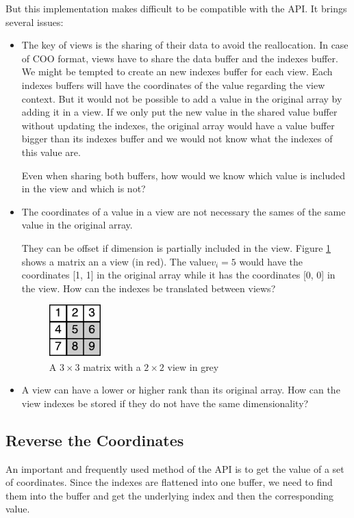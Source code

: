 But this implementation makes difficult to be compatible with the API. It brings several issues:
\begin{itemize}
	\item The key of views is the sharing of their data to avoid the reallocation. In case of COO format, views have to share the data buffer and the indexes buffer. 
	We might be tempted to create an new indexes buffer for each view. Each indexes buffers will have the coordinates of the value regarding the view context. But it  would not be possible to add a value in the original array by adding it in a view. If we only put the new value in the shared value buffer without updating the indexes, the original array would have a value buffer bigger than its indexes buffer and we would not know what the indexes of this value are. 
	
	Even when sharing both buffers, how would we know which value is included in the view and which is not? 	
	
	\item The coordinates of a value in a view are not necessary the sames of the same value in the original array. 
		
	They can be offset if dimension is partially included in the view. Figure \ref{fig:viewOffset} shows a matrix an a view (in red). The value$ v_{i}=5$ would have the coordinates [1, 1] in the original array while it has the coordinates [0, 0] in the view. How can the indexes be translated between views?
	\begin{figure}[!h]
		\centering
		\includegraphics[width=0.8in]{images/viewIndexOffset.pdf}
		\caption{A $3\times 3$ matrix with a $2\times 2$ view in grey}
		\label{fig:viewOffset}
	\end{figure}

	\item A view can have a lower or higher rank than its original array. How can the view indexes be stored if they do not have the same dimensionality?
\end{itemize}

\subsection{Reverse the Coordinates}
\label{ssec:reverse}
An important and frequently used method of the API is to get the value of a set of coordinates. Since the indexes are flattened into one buffer, we need to find them into  the buffer and get the underlying index and then the corresponding value.

